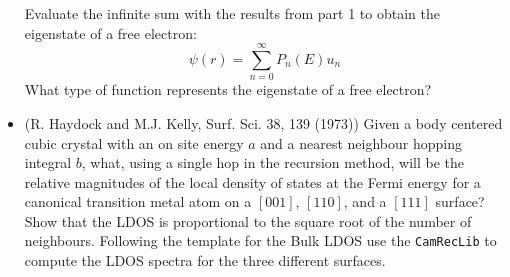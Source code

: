\begin{itemize}
Evaluate the infinite sum with the results from part 1 to obtain the eigenstate
of a free electron:
%
\begin{equation}
\psi(r) = \sum_{n=0}^{\infty}P_{n}(E)u_{n}
\end{equation}
%
What type of function represents the eigenstate of a free electron?

\item (R. Haydock and M.J. Kelly, Surf. Sci. 38, 139 (1973)) 
       Given a body centered cubic crystal with an 
       on site energy $a$ and a nearest neighbour hopping integral
       $b$, what, using a single hop in the recursion method, will be the relative 
       magnitudes of the local density of states 
       at the Fermi energy for a canonical transition metal 
       atom on a $[001]$, $[110]$, and a $[111]$ surface?
       Show that the LDOS is proportional to the square root of the number of neighbours.
       Following the template for the Bulk LDOS use the \texttt{CamRecLib} to compute
       the LDOS spectra for the three different surfaces.

\end{itemize}
